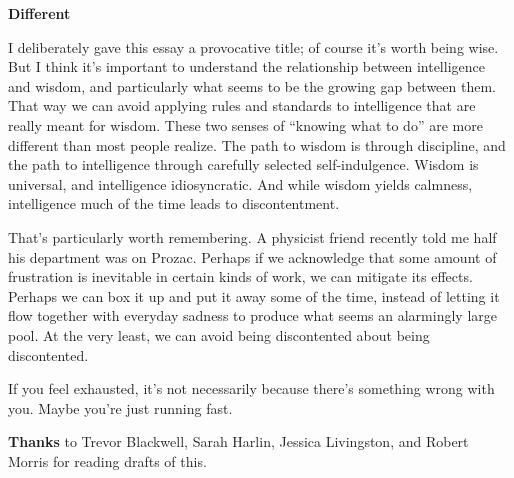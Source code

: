 \textbf{Different}

I deliberately gave this essay a provocative title; of course it's worth
being wise. But I think it's important to understand the relationship
between intelligence and wisdom, and particularly what seems to be the
growing gap between them. That way we can avoid applying rules and
standards to intelligence that are really meant for wisdom. These two
senses of ``knowing what to do'' are more different than most people
realize. The path to wisdom is through discipline, and the path to
intelligence through carefully selected self-indulgence. Wisdom is
universal, and intelligence idiosyncratic. And while wisdom yields
calmness, intelligence much of the time leads to discontentment.

That's particularly worth remembering. A physicist friend recently told
me half his department was on Prozac. Perhaps if we acknowledge that
some amount of frustration is inevitable in certain kinds of work, we
can mitigate its effects. Perhaps we can box it up and put it away some
of the time, instead of letting it flow together with everyday sadness
to produce what seems an alarmingly large pool. At the very least, we
can avoid being discontented about being discontented.

If you feel exhausted, it's not necessarily because there's something
wrong with you. Maybe you're just running fast.


\textbf{Thanks} to Trevor Blackwell, Sarah Harlin, Jessica Livingston,
and Robert Morris for reading drafts of this.